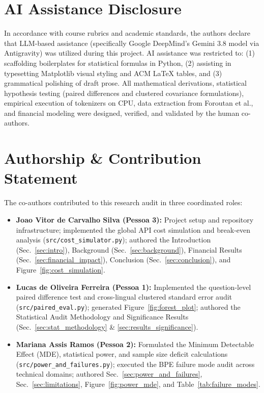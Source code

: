 
\section*{AI Assistance Disclosure}
In accordance with course rubrics and academic standards, the authors declare that LLM-based assistance (specifically Google DeepMind's Gemini 3.8 model via Antigravity) was utilized during this project. AI assistance was restricted to: (1) scaffolding boilerplates for statistical formulas in Python, (2) assisting in typesetting Matplotlib visual styling and ACM LaTeX tables, and (3) grammatical polishing of draft prose. All mathematical derivations, statistical hypothesis testing (paired differences and clustered covariance formulations), empirical execution of tokenizers on CPU, data extraction from Foroutan et al., and financial modeling were designed, verified, and validated by the human co-authors.

\section*{Authorship \& Contribution Statement}
The co-authors contributed to this research audit in three coordinated roles:
\begin{itemize}
    \item \textbf{Joao Vitor de Carvalho Silva (Pessoa 3):} Project setup and repository infrastructure; implemented the global API cost simulation and break-even analysis (\texttt{src/cost_simulator.py}); authored the Introduction (Sec.~\ref{sec:intro}), Background (Sec.~\ref{sec:background}), Financial Results (Sec.~\ref{sec:financial_impact}), Conclusion (Sec.~\ref{sec:conclusion}), and Figure~\ref{fig:cost_simulation}.
    \item \textbf{Lucas de Oliveira Ferreira (Pessoa 1):} Implemented the question-level paired difference test and cross-lingual clustered standard error audit (\texttt{src/paired_eval.py}); generated Figure~\ref{fig:forest_plot}; authored the Statistical Audit Methodology and Significance Results (Sec.~\ref{sec:stat_methodology} \& \ref{sec:results_significance}).
    \item \textbf{Mariana Assis Ramos (Pessoa 2):} Formulated the Minimum Detectable Effect (MDE), statistical power, and sample size deficit calculations (\texttt{src/power_and_failures.py}); executed the BPE failure mode audit across technical domains; authored Sec.~\ref{sec:power_and_failures}, Sec.~\ref{sec:limitations}, Figure~\ref{fig:power_mde}, and Table~\ref{tab:failure_modes}.
\end{itemize}


